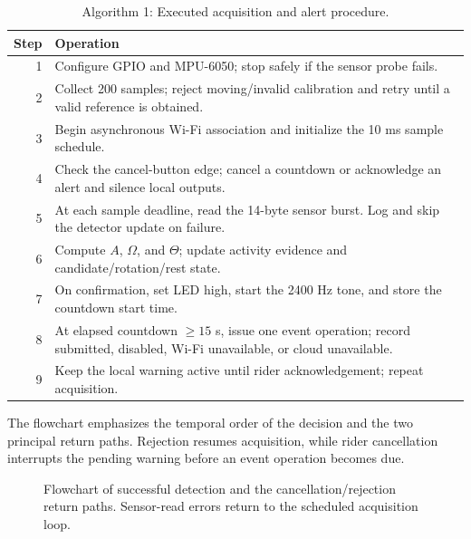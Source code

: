 \documentclass[10pt,a4paper]{article}
\begin{document}
\begin{table}[H]\centering\small\caption{Algorithm 1: Executed acquisition and alert procedure.}
\begin{tabularx}{\linewidth}{@{}rX@{}}\toprule
Step & Operation\\\midrule
1 & Configure GPIO and MPU-6050; stop safely if the sensor probe fails.\\
2 & Collect 200 samples; reject moving/invalid calibration and retry until a valid reference is obtained.\\
3 & Begin asynchronous Wi-Fi association and initialize the 10 ms sample schedule.\\
4 & Check the cancel-button edge; cancel a countdown or acknowledge an alert and silence local outputs.\\
5 & At each sample deadline, read the 14-byte sensor burst. Log and skip the detector update on failure.\\
6 & Compute $A$, $\Omega$, and $\Theta$; update activity evidence and candidate/rotation/rest state.\\
7 & On confirmation, set LED high, start the 2400 Hz tone, and store the countdown start time.\\
8 & At elapsed countdown $\geq15$ s, issue one event operation; record submitted, disabled, Wi-Fi unavailable, or cloud unavailable.\\
9 & Keep the local warning active until rider acknowledgement; repeat acquisition.\\\bottomrule
\end{tabularx}\end{table}

The flowchart emphasizes the temporal order of the decision and the two principal return paths. Rejection resumes acquisition, while rider cancellation interrupts the pending warning before an event operation becomes due.

\begin{figure}[H]\centering
{}\caption{Flowchart of successful detection and the cancellation/rejection return paths. Sensor-read errors return to the scheduled acquisition loop.}
\end{figure}
\end{document}
